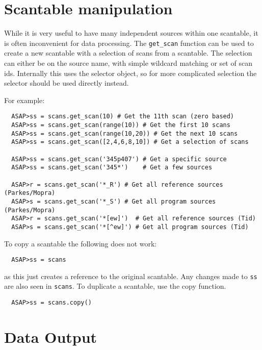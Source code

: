 \documentclass[11pt]{article}
\newcommand{\cmd}[1]{{\tt #1}}
\begin{document}
\section{Scantable manipulation}

While it is very useful to have many
independent sources within one scantable, it is often inconvenient for
data processing. The \cmd{get\_scan} function can be used to create a
new scantable with a selection of scans from a scantable. The
selection can either be on the source name, with simple wildcard
matching or set of scan ids. Internally this uses the selector object,
so for more complicated selection the selector should be used directly
instead.

For example:

\begin{verbatim}
  ASAP>ss = scans.get_scan(10) # Get the 11th scan (zero based)
  ASAP>ss = scans.get_scan(range(10)) # Get the first 10 scans
  ASAP>ss = scans.get_scan(range(10,20)) # Get the next 10 scans
  ASAP>ss = scans.get_scan([2,4,6,8,10]) # Get a selection of scans

  ASAP>ss = scans.get_scan('345p407') # Get a specific source
  ASAP>ss = scans.get_scan('345*')    # Get a few sources

  ASAP>r = scans.get_scan('*_R') # Get all reference sources (Parkes/Mopra)
  ASAP>s = scans.get_scan('*_S') # Get all program sources (Parkes/Mopra)
  ASAP>r = scans.get_scan('*[ew]')  # Get all reference sources (Tid)
  ASAP>s = scans.get_scan('*[^ew]') # Get all program sources (Tid)

\end{verbatim}

To copy a scantable the following does not work:

\begin{verbatim}
  ASAP>ss = scans
\end{verbatim}

as this just creates a reference to the original scantable. Any
changes made to \cmd{ss} are also seen in \cmd{scans}. To duplicate a
scantable, use the copy function.

\begin{verbatim}
  ASAP>ss = scans.copy()
\end{verbatim}

\section{Data Output}
\end{document}
